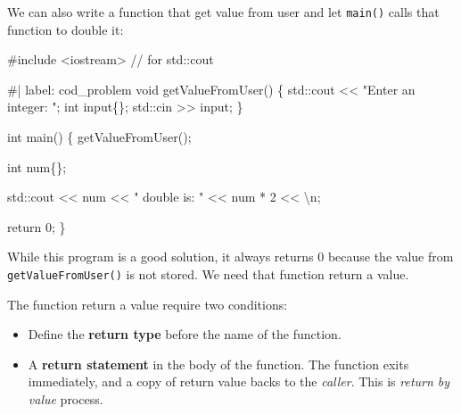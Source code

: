 \documentclass[
  letterpaper,
  DIV=11,
  numbers=noendperiod]{scrreprt}
\newenvironment{Shaded}{\begin{snugshade}}{\end{snugshade}}
\newcommand{\CommentTok}[1]{\textcolor[rgb]{0.37,0.37,0.37}{#1}}
\newcommand{\DecValTok}[1]{\textcolor[rgb]{0.68,0.00,0.00}{#1}}
\newcommand{\ErrorTok}[1]{\textcolor[rgb]{0.68,0.00,0.00}{#1}}
\newcommand{\FunctionTok}[1]{\textcolor[rgb]{0.28,0.35,0.67}{#1}}
\newcommand{\NormalTok}[1]{\textcolor[rgb]{0.00,0.23,0.31}{#1}}
\newcommand{\SpecialCharTok}[1]{\textcolor[rgb]{0.37,0.37,0.37}{#1}}
\newcommand{\StringTok}[1]{\textcolor[rgb]{0.13,0.47,0.30}{#1}}
\providecommand{\tightlist}{%
  \setlength{\itemsep}{0pt}\setlength{\parskip}{0pt}}\usepackage{longtable,booktabs,array}
\begin{document}
We can also write a function that get value from user and let
\texttt{main()} calls that function to double it:

\begin{Shaded}
\begin{Highlighting}[]
\CommentTok{\#include \textless{}iostream\textgreater{}     // for std::cout}

\CommentTok{\#| label: cod\_problem}
\NormalTok{void }\FunctionTok{getValueFromUser}\NormalTok{()}
\NormalTok{\{}
\NormalTok{    std}\SpecialCharTok{::}\NormalTok{cout }\SpecialCharTok{\textless{}}\ErrorTok{\textless{}} \StringTok{"Enter an integer: "}\NormalTok{;}
\NormalTok{    int input\{\};}
\NormalTok{    std}\SpecialCharTok{::}\NormalTok{cin }\SpecialCharTok{\textgreater{}}\ErrorTok{\textgreater{}}\NormalTok{ input;}
\NormalTok{\}}

\NormalTok{int }\FunctionTok{main}\NormalTok{()}
\NormalTok{\{}
    \FunctionTok{getValueFromUser}\NormalTok{();}

\NormalTok{    int num\{\};}

\NormalTok{    std}\SpecialCharTok{::}\NormalTok{cout }\SpecialCharTok{\textless{}}\ErrorTok{\textless{}}\NormalTok{ num }\SpecialCharTok{\textless{}}\ErrorTok{\textless{}} \StringTok{" double is: "} \SpecialCharTok{\textless{}}\ErrorTok{\textless{}}\NormalTok{ num }\SpecialCharTok{*} \DecValTok{2} \SpecialCharTok{\textless{}}\ErrorTok{\textless{}} \StringTok{\textquotesingle{}}\SpecialCharTok{\textbackslash{}n}\StringTok{\textquotesingle{}}\NormalTok{;}

\NormalTok{    return }\DecValTok{0}\NormalTok{;}
\NormalTok{\}}
\end{Highlighting}
\end{Shaded}

While this program is a good solution, it always returns 0 because the
value from \texttt{getValueFromUser()} is not stored. We need that
function return a value.

The function return a value require two conditions:

\begin{itemize}
\tightlist
\item
  Define the \textbf{return type} before the name of the function.
\item
  A \textbf{return statement} in the body of the function. The function
  exits immediately, and a copy of return value backs to the
  \emph{caller}. This is \emph{return by value} process.
\end{itemize}
\end{document}
